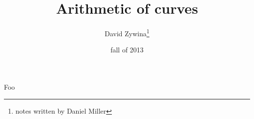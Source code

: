 \documentclass{article}
\title{Arithmetic of curves}
\author{David Zywina\thanks{notes written by Daniel Miller}}
\date{fall of 2013}
\begin{document}
\maketitle





Foo
\end{document}
